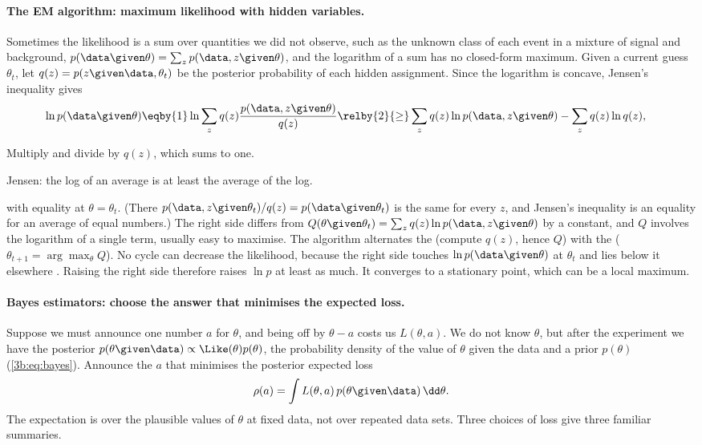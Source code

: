 \paragraph{The EM algorithm: maximum likelihood with hidden variables.}
Sometimes the likelihood is a sum over quantities we did not observe, such as the
unknown class of each event in a mixture of signal and background,
$p(\data\given\theta)=\sum_zp(\data,z\given\theta)$, and the logarithm of a sum
has no closed-form maximum. Given a current guess $\theta_t$, let
$q(z)=p(z\given\data,\theta_t)$ be the posterior probability of each hidden
assignment. Since the logarithm is concave, Jensen's inequality gives
\begin{align}
  \ln p(\data\given\theta)
  &\eqby{1}\ln\sum_zq(z)\frac{p(\data,z\given\theta)}{q(z)}
   \relby{2}{\ge}\sum_zq(z)\ln p(\data,z\given\theta)-\sum_zq(z)\ln q(z),
  \label{3b:eq:em}
\end{align}
\begin{explain}
  \item Multiply and divide by $q(z)$, which sums to one.
  \item Jensen: the log of an average is at least the average of the log.
\end{explain}
with equality at $\theta=\theta_t$. (There
$p(\data,z\given\theta_t)/q(z)=p(\data\given\theta_t)$ is the same for every
$z$, and Jensen's inequality is an equality for an average of equal
numbers.) The right side differs from
$Q(\theta\given\theta_t)=\sum_zq(z)\ln p(\data,z\given\theta)$ by a constant,
and $Q$ involves the logarithm of a single term, usually easy to maximise.
The algorithm alternates the  (compute $q(z)$, hence $Q$) with
the  ($\theta_{t+1}=\arg\max_\theta Q$). No cycle can
decrease the likelihood, because the right side touches $\ln p(\data\given\theta)$ at
$\theta_t$ and lies below it elsewhere . Raising the
right side therefore raises $\ln p$ at least as much. It converges to a
stationary point, which can be a local maximum.

\paragraph{Bayes estimators: choose the answer that minimises the expected loss.}
Suppose we must announce one number $a$ for $\theta$, and being off by
$\theta-a$ costs us $L(\theta,a)$. We do not know $\theta$, but after the
experiment we have the posterior $p(\theta\given\data)\propto
\Like(\theta)p(\theta)$, the probability density of the value of $\theta$ given the
data and a prior $p(\theta)$ (\cref{3b:eq:bayes}). Announce the $a$ that
minimises the posterior expected loss
\[
  \rho(a)=\int L(\theta,a)\,p(\theta\given\data)\,\dd\theta .
\]
The expectation is over the plausible values of $\theta$ at fixed data,
not over repeated data sets. Three choices of loss give three familiar
summaries.

